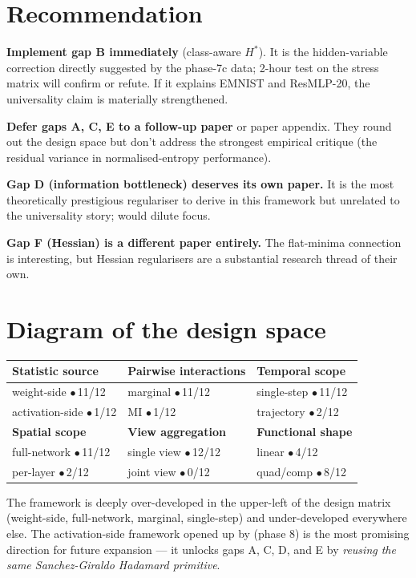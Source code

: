 \documentclass[11pt,a4paper]{article}
\newcommand{\code}[1]{\texttt{\detokenize{#1}}}
\begin{document}
\section{Recommendation}

\textbf{Implement gap B immediately} (class-aware $H^*$). It is the
hidden-variable correction directly suggested by the phase-7c data;
2-hour test on the stress matrix will confirm or refute. If it
explains EMNIST and ResMLP-20, the universality claim is materially
strengthened.

\textbf{Defer gaps A, C, E to a follow-up paper} or paper appendix.
They round out the design space but don't address the strongest
empirical critique (the residual variance in normalised-entropy
performance).

\textbf{Gap D (information bottleneck) deserves its own paper.} It is
the most theoretically prestigious regulariser to derive in this
framework but unrelated to the universality story; would dilute focus.

\textbf{Gap F (Hessian) is a different paper entirely.} The flat-minima
connection is interesting, but Hessian regularisers are a substantial
research thread of their own.

\section{Diagram of the design space}

\begin{center}
\begin{tabular}{@{}lll@{}}
\toprule
\textbf{Statistic source} & \textbf{Pairwise interactions} & \textbf{Temporal scope} \\
\midrule
weight-side $\bullet$\,11/12 & marginal $\bullet$\,11/12 & single-step $\bullet$\,11/12 \\
activation-side $\bullet$\,1/12 & MI $\bullet$\,1/12 & trajectory $\bullet$\,2/12 \\
\midrule
\textbf{Spatial scope} & \textbf{View aggregation} & \textbf{Functional shape} \\
\midrule
full-network $\bullet$\,11/12 & single view $\bullet$\,12/12 & linear $\bullet$\,4/12 \\
per-layer $\bullet$\,2/12     & joint view $\bullet$\,0/12   & quad/comp $\bullet$\,8/12 \\
\bottomrule
\end{tabular}
\end{center}

The framework is deeply over-developed in the upper-left of the
design matrix (weight-side, full-network, marginal, single-step) and
under-developed everywhere else. The activation-side framework opened
up by \code{cross_layer_mi} (phase 8) is the most promising direction
for future expansion --- it unlocks gaps A, C, D, and E by
\emph{reusing the same Sanchez-Giraldo Hadamard primitive}.
\end{document}
